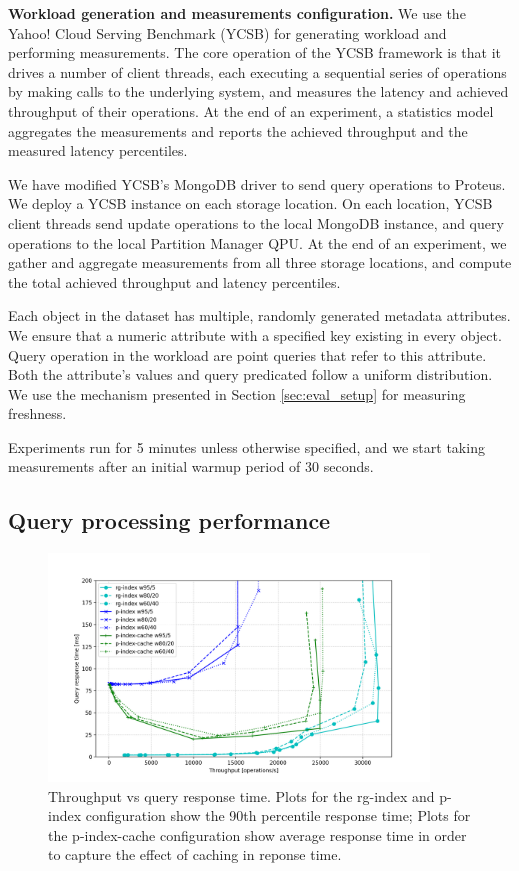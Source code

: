 \bigskip
\noindent
\textbf{Workload generation and measurements configuration.}
We use the Yahoo! Cloud Serving Benchmark (YCSB) \cite{ycsb} for generating workload and performing measurements.
The core operation of the YCSB framework is that it drives a number of client threads,
each executing a sequential series of operations by making calls to the underlying system,
and measures the latency and achieved throughput of their operations.
At the end of an experiment, a statistics model aggregates the measurements and reports the achieved throughput and
the measured latency percentiles.

We have modified YCSB's MongoDB driver to send query operations to Proteus.
We deploy a YCSB instance on each storage location.
On each location, YCSB client threads send update operations to the local MongoDB instance,
and query operations to the local Partition Manager QPU.
At the end of an experiment, we gather and aggregate measurements from all three storage locations,
and compute the total achieved throughput and latency percentiles.

Each object in the dataset has multiple, randomly generated metadata attributes.
We ensure that a numeric attribute with a specified key existing in every object.
Query operation in the workload are point queries that refer to this attribute.
Both the attribute's values and query predicated follow a uniform distribution.
We use the mechanism presented in Section \ref{sec:eval_setup} for measuring freshness.

Experiments run for 5 minutes unless otherwise specified, and we start taking measurements after an initial
warmup period of 30 seconds.

\subsection{Query processing performance}

\begin{figure}[H]
\centering
  \includegraphics[width=0.9\textwidth]{./figures/evaluation/ycsb_responseTime.png}
  \caption{Throughput vs query response time. Plots for the rg-index and p-index configuration show the 90th percentile response time;
  Plots for the p-index-cache configuration show average response time in order to capture the effect of caching in reponse time.}
  \label{fig:ycsb_responseTime}
\end{figure}

